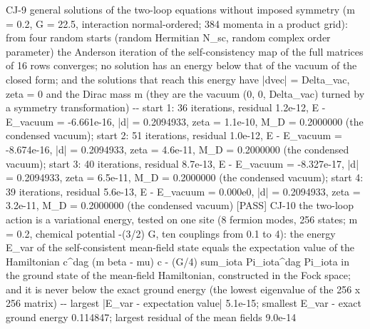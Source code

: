 \documentclass[
  10pt,
]{article}
\newenvironment{Shaded}{}{}
\newcommand{\NormalTok}[1]{#1}
\begin{document}
\begin{Shaded}
\begin{Highlighting}[]
\NormalTok{[PASS] CJ{-}9  general solutions of the two{-}loop equations without imposed symmetry (m = 0.2, G = 22.5, interaction normal{-}ordered; 384 momenta in a product grid): from four random starts (random Hermitian N\_sc, random complex order parameter) the Anderson iteration of the self{-}consistency map of the full matrices of 16 rows converges; no solution has an energy below that of the vacuum of the closed form; and the solutions that reach this energy have |dvec| = Delta\_vac, zeta = 0 and the Dirac mass m (they are the vacuum (0, 0, Delta\_vac) turned by a symmetry transformation)  {-}{-} start 1: 36 iterations, residual 1.2e{-}12, E {-} E\_vacuum = {-}6.661e{-}16, |d| = 0.2094933, zeta = 1.1e{-}10, M\_D = 0.2000000 (the condensed vacuum); start 2: 51 iterations, residual 1.0e{-}12, E {-} E\_vacuum = {-}8.674e{-}16, |d| = 0.2094933, zeta = 4.6e{-}11, M\_D = 0.2000000 (the condensed vacuum); start 3: 40 iterations, residual 8.7e{-}13, E {-} E\_vacuum = {-}8.327e{-}17, |d| = 0.2094933, zeta = 6.5e{-}11, M\_D = 0.2000000 (the condensed vacuum); start 4: 39 iterations, residual 5.6e{-}13, E {-} E\_vacuum = 0.000e0, |d| = 0.2094933, zeta = 3.2e{-}11, M\_D = 0.2000000 (the condensed vacuum)}
\NormalTok{[PASS] CJ{-}10  the two{-}loop action is a variational energy, tested on one site (8 fermion modes, 256 states; m = 0.2, chemical potential {-}(3/2) G, ten couplings from 0.1 to 4): the energy E\_var of the self{-}consistent mean{-}field state equals the expectation value of the Hamiltonian c\^{}dag (m beta {-} mu) c {-} (G/4) sum\_iota Pi\_iota\^{}dag Pi\_iota in the ground state of the mean{-}field Hamiltonian, constructed in the Fock space; and it is never below the exact ground energy (the lowest eigenvalue of the 256 x 256 matrix)  {-}{-} largest |E\_var {-} expectation value| 5.1e{-}15; smallest E\_var {-} exact ground energy 0.114847; largest residual of the mean fields 9.0e{-}14}

\end{Highlighting}
\end{Shaded}
\end{document}

